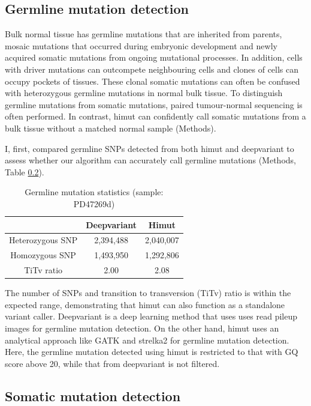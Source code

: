 \subsection{Germline mutation detection}

Bulk normal tissue has germline mutations that are inherited from parents, mosaic mutations that occurred during embryonic development and newly acquired somatic mutations from ongoing mutational processes. In addition, cells with driver mutations can outcompete neighbouring cells and clones of cells can occupy pockets of tissues. These clonal somatic mutations can often be confused with heterozygous germline mutations in normal bulk tissue. To distinguish germline mutations from somatic mutations, paired tumour-normal sequencing is often performed. In contrast, himut can confidently call somatic mutations from a bulk tissue without a matched normal sample (Methods). 

I, first, compared germline SNPs detected from both himut and deepvariant to assess whether our algorithm can accurately call germline mutations (Methods, Table \ref{}).

\begin{table}[h!]
\caption{Germline mutation statistics (sample: PD47269d)}
\label{tab:adapter-miscalling-statistics}
\begin{tabular}{c|c|c}
& Deepvariant & Himut \\ \hline
Heterozygous SNP & 2,394,488 & 2,040,007 \\ \hline
Homozygous SNP & 1,493,950 & 1,292,806 \\ \hline
TiTv ratio & 2.00 & 2.08 \\ \hline
\end{tabular}
\end{table}

The number of SNPs and transition to transversion (TiTv) ratio is within the expected range, demonstrating that himut can also function as a standalone variant caller. Deepvariant is a deep learning method that uses uses read pileup images for germline mutation detection. On the other hand, himut uses an analytical approach like GATK and strelka2 \cite{Kim2018-qi, DePristo2011-vf}  for germline mutation detection. Here, the germline mutation detected using himut is restricted to that with GQ score above 20, while that from deepvariant is not filtered.

\subsection{Somatic mutation detection}

